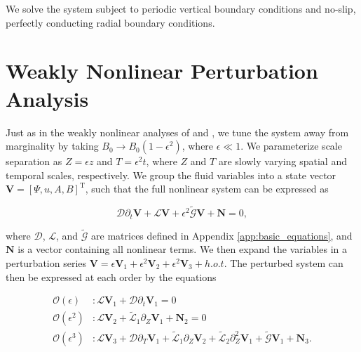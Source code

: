\documentclass[onecolumn]{emulateapj}
\newcommand{\beq}{\begin{equation}}
\newcommand{\eeq}{\end{equation}}
\newcommand{\citei}[1]{\citeauthor{#1} \citeyear{#1}}
\begin{document}
We solve the system subject to periodic vertical boundary conditions and no-slip, perfectly conducting radial boundary conditions. 

\section{Weakly Nonlinear Perturbation Analysis}

Just as in the weakly nonlinear analyses of \citei{Umurhan:2007hs} and \citei{Clark:2016}, we tune the system away from marginality by taking $B_0 \rightarrow B_0\left(1 - \epsilon^2\right)$, where $\epsilon \ll 1$. We parameterize scale separation as $Z = \epsilon z$ and $T = \epsilon^2 t$, where $Z$ and $T$ are slowly varying spatial and temporal scales, respectively. We group the fluid variables into a state vector $\mathbf{V} = \left[\Psi, u, A, B\right]^{\mathrm{T}}$, such that the full nonlinear system can be expressed as

\beq\label{eq:unperturbed_matrix_eqns}
\mathcal{D}\partial_t\mathbf{V} + \mathcal{L}\mathbf{V} + \epsilon^2 \widetilde{\mathcal{G}} \mathbf{V} + \mathbf{N} = 0,
\eeq

where $\mathcal{D}$, $\mathcal{L}$, and $\widetilde{\mathcal{G}}$ are matrices defined in Appendix \ref{app:basic_equations}, and $\mathbf{N}$ is a vector containing all nonlinear terms. We then expand the variables in a perturbation series $\mathbf{V} = \epsilon \mathbf{V}_1 + \epsilon^2 \mathbf{V}_2 + \epsilon^2 \mathbf{V}_3 + h.o.t.$ The perturbed system can then be expressed at each order by the equations

\begin{align}
\mathcal{O}(\epsilon)&: \mathcal{L} \mathbf{V}_1 + \mathcal{D} \partial_t \mathbf{V}_1 = 0 \label{eq:ordere}\\
\mathcal{O}(\epsilon^2)&: \mathcal{L} \mathbf{V}_2 + \widetilde{\mathcal{L}}_1 \partial_Z \mathbf{V}_1 + \mathbf{N}_2 = 0 \label{eq:ordere2}\\
\mathcal{O}(\epsilon^3)&: \mathcal{L}\mathbf{V}_3 + \mathcal{D} \partial_T \mathbf{V}_1 + \widetilde{\mathcal{L}}_1 \partial_Z \mathbf{V}_2 + \widetilde{\mathcal{L}}_2 \partial_Z^2 \mathbf{V}_1 + \widetilde{\mathcal{G}} \mathbf{V}_1 + \mathbf{N}_3. \label{eq:ordere3}
\end{align}
\end{document}
